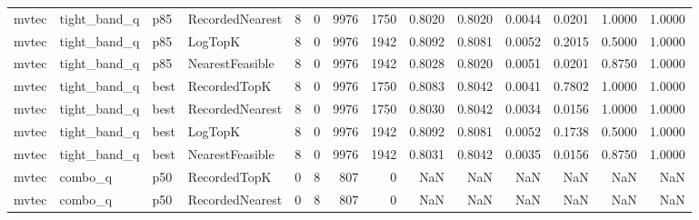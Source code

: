 \begin{tabular}{llllrrrrrrrrrr}
   mvtec &         tight\_band\_q &    p85 & RecordedNearest &           8 &          0 &           9976 &                1750 &         0.8020 &          0.8020 &                    0.0044 &         0.0201 &                 1.0000 &                  1.0000 \\
   mvtec &         tight\_band\_q &    p85 &         LogTopK &           8 &          0 &           9976 &                1942 &         0.8092 &          0.8081 &                    0.0052 &         0.2015 &                 0.5000 &                  1.0000 \\
   mvtec &         tight\_band\_q &    p85 & NearestFeasible &           8 &          0 &           9976 &                1942 &         0.8028 &          0.8020 &                    0.0051 &         0.0201 &                 0.8750 &                  1.0000 \\
   mvtec &         tight\_band\_q &   best &    RecordedTopK &           8 &          0 &           9976 &                1750 &         0.8083 &          0.8042 &                    0.0041 &         0.7802 &                 1.0000 &                  1.0000 \\
   mvtec &         tight\_band\_q &   best & RecordedNearest &           8 &          0 &           9976 &                1750 &         0.8030 &          0.8042 &                    0.0034 &         0.0156 &                 1.0000 &                  1.0000 \\
   mvtec &         tight\_band\_q &   best &         LogTopK &           8 &          0 &           9976 &                1942 &         0.8092 &          0.8081 &                    0.0052 &         0.1738 &                 0.5000 &                  1.0000 \\
   mvtec &         tight\_band\_q &   best & NearestFeasible &           8 &          0 &           9976 &                1942 &         0.8031 &          0.8042 &                    0.0035 &         0.0156 &                 0.8750 &                  1.0000 \\
   mvtec &              combo\_q &    p50 &    RecordedTopK &           0 &          8 &            807 &                   0 &            NaN &             NaN &                       NaN &            NaN &                    NaN &                     NaN \\
   mvtec &              combo\_q &    p50 & RecordedNearest &           0 &          8 &            807 &                   0 &            NaN &             NaN &                       NaN &            NaN &                    NaN &                     NaN \\

\end{tabular}
